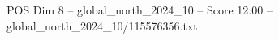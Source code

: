 \begin{textsample}{POS Dim 8 – global\_north\_2024\_10 – Score 12.00 – global\_north\_2024\_10/115576356.txt}
\end{textsample}

